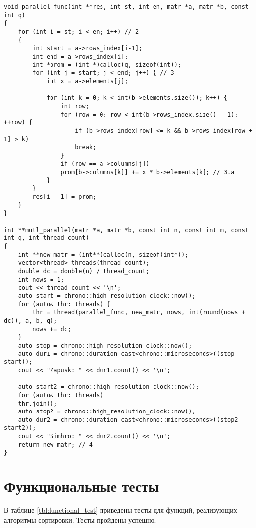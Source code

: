 \begin{lstlisting}[label=lst:shaker_sort,caption=Реализация паралельного алгоритма умножения разреженных матриц]
void parallel_func(int **res, int st, int en, matr *a, matr *b, const int q)
{
	for (int i = st; i < en; i++) // 2
	{
		int start = a->rows_index[i-1];
		int end = a->rows_index[i];
		int *prom = (int *)calloc(q, sizeof(int));
		for (int j = start; j < end; j++) { // 3
			int x = a->elements[j];
			
			for (int k = 0; k < int(b->elements.size()); k++) {
				int row;
				for (row = 0; row < int(b->rows_index.size() - 1); ++row) {
					if (b->rows_index[row] <= k && b->rows_index[row + 1] > k)
					break;
				}
				if (row == a->columns[j])
				prom[b->columns[k]] += x * b->elements[k]; // 3.a
			}
		}
		res[i - 1] = prom;
	}
}

int **mutl_parallel(matr *a, matr *b, const int n, const int m, const int q, int thread_count)
{
	int **new_matr = (int**)calloc(n, sizeof(int*));
	vector<thread> threads(thread_count);
	double dc = double(n) / thread_count;
	int nows = 1;
	cout << thread_count << '\n';
	auto start = chrono::high_resolution_clock::now();
	for (auto& thr: threads) {
		thr = thread(parallel_func, new_matr, nows, int(round(nows + dc)), a, b, q);
		nows += dc;
	}
	auto stop = chrono::high_resolution_clock::now();
	auto dur1 = chrono::duration_cast<chrono::microseconds>((stop - start));
	cout << "Zapusk: " << dur1.count() << '\n';
	
	auto start2 = chrono::high_resolution_clock::now();
	for (auto& thr: threads)
	thr.join();
	auto stop2 = chrono::high_resolution_clock::now();
	auto dur2 = chrono::duration_cast<chrono::microseconds>((stop2 - start2));
	cout << "Simhro: " << dur2.count() << '\n';
	return new_matr; // 4
}
\end{lstlisting}

\section{Функциональные тесты}

В таблице \ref{tbl:functional_test} приведены тесты для функций, реализующих алгоритмы сортировки. Тесты пройдены успешно.

